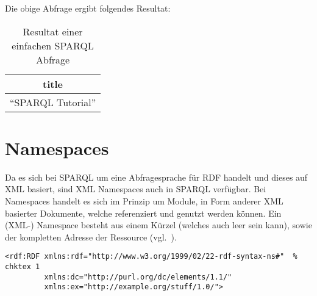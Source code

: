 Die obige Abfrage ergibt folgendes Resultat:
\noindent\hspace*{15mm}
\begin{table}[h]
    \centering
    \begin{tabular}{|l|}
        \hline
        \multicolumn{1}{|c|}{\textbf{title}} \\ \hline
        ``SPARQL Tutorial''                    \\ \hline
    \end{tabular}
    \caption{Resultat einer einfachen SPARQL Abfrage\protect\footnotemark}
\end{table}

\section{Namespaces}
\label{sec:sparql_namespaces}

Da es sich bei SPARQL um eine Abfragesprache für RDF handelt und dieses auf XML basiert, sind XML Namespaces auch in SPARQL verfügbar. Bei Namespaces handelt es sich im Prinzip um Module, in Form anderer XML basierter Dokumente, welche referenziert und genutzt werden können. Ein (XML-) Namespace besteht aus einem Kürzel (welches auch leer sein kann), sowie der kompletten Adresse der Ressource (vgl.~\cite[2.1 Introduction]{w3rdf_syntax}).

\begin{lstlisting}
<rdf:RDF xmlns:rdf="http://www.w3.org/1999/02/22-rdf-syntax-ns#"  % chktex 1
         xmlns:dc="http://purl.org/dc/elements/1.1/"
         xmlns:ex="http://example.org/stuff/1.0/">
\end{lstlisting}

